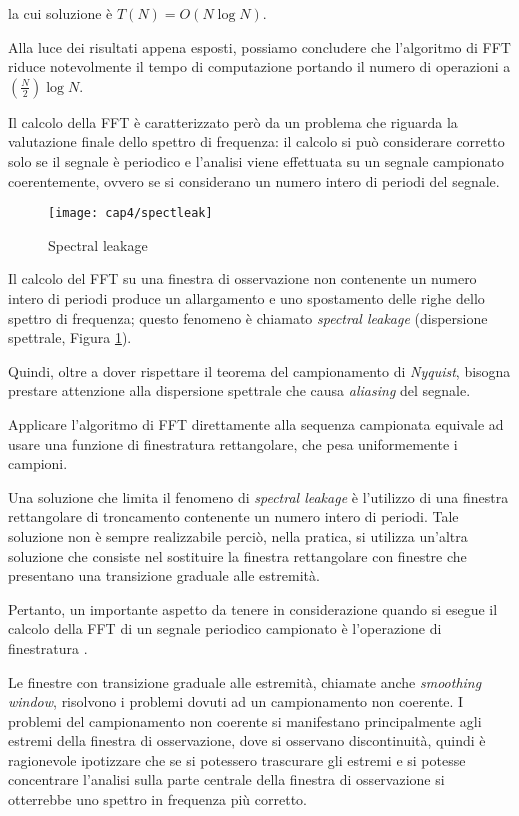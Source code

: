 la cui soluzione è $T(N)=O(N \log N )$.

Alla luce dei risultati appena esposti, possiamo concludere che l'algoritmo di FFT riduce notevolmente il tempo di computazione portando il numero di operazioni a $(\frac{N}{2}) \log N$.

Il calcolo della FFT è caratterizzato però da un problema che riguarda la valutazione finale dello spettro di frequenza: il calcolo si può considerare corretto solo se il segnale è periodico e l'analisi viene effettuata su un segnale campionato coerentemente, ovvero se si considerano un numero intero di periodi del segnale.

\begin{figure}  
  \begin{center}
    \texttt{[image: cap4/spectleak]}
    \caption{Spectral leakage}
    \label{spectleak}
  \end{center}
\end{figure}

Il calcolo del FFT su una finestra di osservazione non contenente un numero intero di periodi produce un allargamento e uno spostamento delle righe dello spettro di frequenza; questo fenomeno è chiamato \textit{spectral leakage} (dispersione spettrale, Figura \ref{spectleak}). 

Quindi, oltre a dover rispettare il teorema del campionamento di \textit{Nyquist}, bisogna prestare attenzione alla dispersione spettrale che causa \textit{aliasing} del segnale.

Applicare l'algoritmo di FFT direttamente alla sequenza campionata equivale ad usare una funzione di finestratura rettangolare, che pesa uniformemente i campioni.

Una soluzione che limita il fenomeno di \textit{spectral leakage} è l'utilizzo di una finestra rettangolare di troncamento contenente un numero intero di periodi. Tale soluzione non è sempre realizzabile perciò, nella pratica, si utilizza un'altra soluzione che consiste nel sostituire la finestra rettangolare con finestre che presentano una transizione graduale alle estremità. 

Pertanto, un importante aspetto da tenere in considerazione quando si esegue il calcolo della FFT di un segnale periodico campionato è l'operazione di finestratura \cite{31004}. 

Le finestre con transizione graduale alle estremità, chiamate anche \textit{smoothing window}, risolvono i problemi dovuti ad un campionamento non coerente. I problemi del campionamento non coerente si manifestano principalmente agli estremi della finestra di osservazione, dove si osservano discontinuità, quindi è ragionevole ipotizzare che se si potessero trascurare gli estremi e si potesse concentrare l'analisi sulla parte centrale della finestra di osservazione si otterrebbe uno spettro in frequenza più corretto. 


